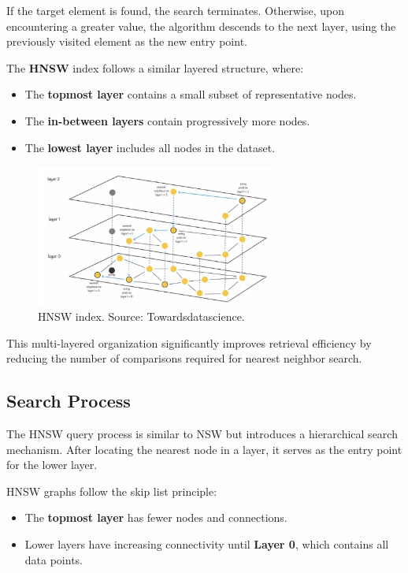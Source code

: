 If the target element is found, the search terminates. Otherwise, upon encountering a greater value, the algorithm descends to the next layer, using the previously visited element as the new entry point.  


The \textbf{HNSW} index follows a similar layered structure, where:
\begin{itemize}
    \item The \textbf{topmost layer} contains a small subset of representative nodes.
    \item The \textbf{in-between layers} contain progressively more nodes.
    \item The \textbf{lowest layer} includes all nodes in the dataset.
\end{itemize}
\begin{figure}[h]
    \centering
\includegraphics[width=0.7\textwidth]{IMAGES/immagine_2025-02-27_133909960.png}
    \caption[HNSW]{HNSW index. Source: Towardsdatascience.\footnotemark[2]}
    \label{fig:HNSW}
\end{figure}
This multi-layered organization significantly improves retrieval efficiency by reducing the number of comparisons required for nearest neighbor search.  

\subsection{Search Process}  

The HNSW query process is similar to NSW but introduces a hierarchical search mechanism. After locating the nearest node in a layer, it serves as the entry point for the lower layer.  

HNSW graphs follow the skip list principle:  
\begin{itemize}  
    \item The \textbf{topmost layer} has fewer nodes and connections.  
    \item Lower layers have increasing connectivity until \textbf{Layer 0}, which contains all data points.  
\end{itemize}  

